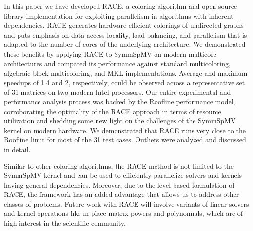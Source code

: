 In this paper we have developed \acrshort{RACE}, a coloring algorithm and open-source library
implementation for exploiting parallelism in algorithms with inherent dependencies.
\acrshort{RACE} generates hardware-efficient \DK colorings of undirected graphs and puts 
emphasis on data access locality, load balancing, and 
parallelism that is adapted to the number of cores of the underlying architecture.  We
demonstrated these benefits by applying \acrshort{RACE} to \acrfull{SymmSpMV} on modern
multicore architectures and compared its performance against
standard multicoloring, algebraic block multicoloring, and \acrshort{MKL}
implementations. Average and maximum speedups of 1.4 and 2, respectively,
could be observed across a representative set of 31 matrices on
two modern Intel processors. 
Our entire experimental and performance analysis process was backed by the
Roof{}line performance model, corroborating the optimality of
the \acrshort{RACE} approach in terms of resource utilization and shedding some new
light on the challenges of the \acrshort{SymmSpMV} kernel on modern hardware.
We demonstrated that \acrshort{RACE} runs very close to the Roof{}line limit for
most of the 31 test cases. Outliers were analyzed and discussed in detail.

Similar to other coloring algorithms, the \acrshort{RACE} method is not
limited to the \acrshort{SymmSpMV} kernel and can be used to efficiently
parallelize solvers and kernels having general \DK dependencies. Moreover, due
to the level-based formulation of \acrshort{RACE}, the framework has an added
advantage that allows us to address other classes of problems. Future work
with \acrshort{RACE} will involve variants of linear solvers and kernel
operations like in-place matrix powers and polynomials, which are of high
interest in the scientific community.




